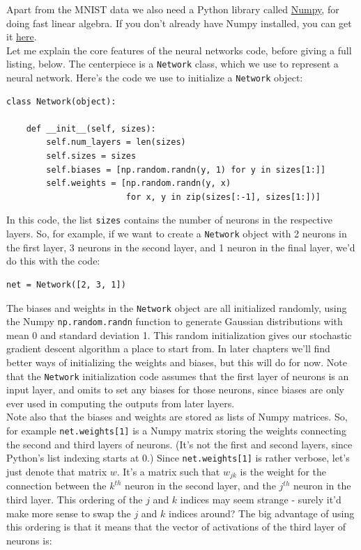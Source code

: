 Apart from the MNIST data we also need a Python library called \href{https://numpy.org/}{Numpy}, for doing fast linear algebra. If you don't already have Numpy installed, you can get it \href{https://numpy.org/install/}{here}.\\

Let me explain the core features of the neural networks code, before giving a full listing, below. The centerpiece is a \texttt{Network} class, which we use to represent a neural network. Here's the code we use to initialize a \texttt{Network} object:

\begin{lstlisting}
class Network(object):

    def __init__(self, sizes):
        self.num_layers = len(sizes)
        self.sizes = sizes
        self.biases = [np.random.randn(y, 1) for y in sizes[1:]]
        self.weights = [np.random.randn(y, x) 
                        for x, y in zip(sizes[:-1], sizes[1:])]
\end{lstlisting}

In this code, the list \texttt{sizes} contains the number of neurons in the respective layers. So, for example, if we want to create a \texttt{Network} object with 2 neurons in the first layer, 3 neurons in the second layer, and 1 neuron in the final layer, we'd do this with the code:

\begin{lstlisting}
net = Network([2, 3, 1])
\end{lstlisting}

The biases and weights in the \texttt{Network} object are all initialized randomly, using the Numpy \texttt{np.random.randn} function to generate Gaussian distributions with mean 0 and standard deviation 1. This random initialization gives our stochastic gradient descent algorithm a place to start from. In later chapters we'll find better ways of initializing the weights and biases, but this will do for now. Note that the \texttt{Network} initialization code assumes that the first layer of neurons is an input layer, and omits to set any biases for those neurons, since biases are only ever used in computing the outputs from later layers.\\

Note also that the biases and weights are stored as lists of Numpy matrices. So, for example \texttt{net.weights[1]} is a Numpy matrix storing the weights connecting the second and third layers of neurons. (It's not the first and second layers, since Python's list indexing starts at 0.) Since \texttt{net.weights[1]} is rather verbose, let's just denote that matrix $w$. It's a matrix such that $w_{jk}$ is the weight for the connection between the $k^{th}$ neuron in the second layer, and the $j^{th}$ neuron in the third layer. This ordering of the $j$ and $k$ indices may seem strange - surely it'd make more sense to swap the $j$ and $k$ indices around? The big advantage of using this ordering is that it means that the vector of activations of the third layer of neurons is:

